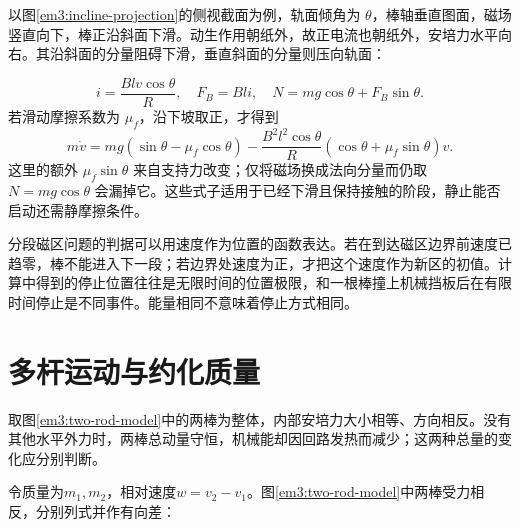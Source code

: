 以图\ref{em3:incline-projection}的侧视截面为例，轨面倾角为 $\theta$，棒轴垂直图面，磁场竖直向下，棒正沿斜面下滑。动生作用朝纸外，故正电流也朝纸外，安培力水平向右。其沿斜面的分量阻碍下滑，垂直斜面的分量则压向轨面：

\[
i=\frac{Blv\cos\theta}{R},\quad F_B=Bli,\quad
N=mg\cos\theta+F_B\sin\theta.
\]
若滑动摩擦系数为 $\mu_f$，沿下坡取正，才得到
\[
m\dot v=mg(\sin\theta-\mu_f\cos\theta)
-\frac{B^2l^2\cos\theta}{R}(\cos\theta+\mu_f\sin\theta)v.
\]
这里的额外 $\mu_f\sin\theta$ 来自支持力改变；仅将磁场换成法向分量而仍取 $N=mg\cos\theta$ 会漏掉它。这些式子适用于已经下滑且保持接触的阶段，静止能否启动还需静摩擦条件。


分段磁区问题的判据可以用速度作为位置的函数表达。若在到达磁区边界前速度已趋零，棒不能进入下一段；若边界处速度为正，才把这个速度作为新区的初值。计算中得到的停止位置往往是无限时间的位置极限，和一根棒撞上机械挡板后在有限时间停止是不同事件。能量相同不意味着停止方式相同。



\section{多杆运动与约化质量}



取图\ref{em3:two-rod-model}中的两棒为整体，内部安培力大小相等、方向相反。没有其他水平外力时，两棒总动量守恒，机械能却因回路发热而减少；这两种总量的变化应分别判断。


令质量为$m_1,m_2$，相对速度$w=v_2-v_1$。图\ref{em3:two-rod-model}中两棒受力相反，分别列式并作有向差：

